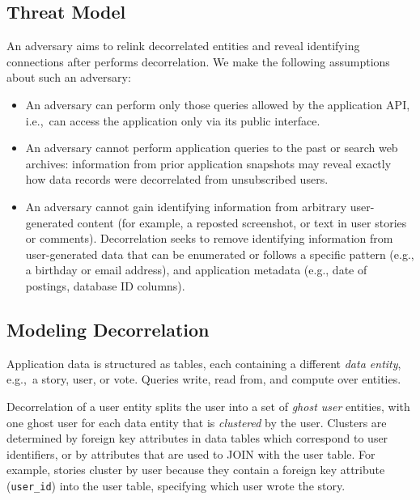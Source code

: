 \subsection{Threat Model} 
An adversary aims to relink decorrelated entities and reveal identifying connections after \sys{}
performs decorrelation. We make the following assumptions about such an adversary: 
\begin{itemize}
    \item An adversary can perform only those queries allowed by the application API, 
i.e.,\ can access the application only via its public interface. 

    \item An adversary cannot perform application queries to the past or search web archives:
    information from prior application snapshots may reveal 
    exactly how data records were decorrelated from unsubscribed users. 

    \item An adversary cannot gain identifying information from arbitrary user-generated content (for
        example, a reposted screenshot, or text in user stories or comments). Decorrelation seeks to
        remove identifying information from user-generated data that can be enumerated or follows a
        specific pattern (e.g., a birthday or email address), and application metadata (e.g., date
        of postings, database ID columns).
\end{itemize}

\subsection{Modeling Decorrelation}
Application data is structured as tables, each containing a different \emph{data entity}, e.g.,\ a
story, user, or vote.  
Queries write, read
from, and compute over entities. 

Decorrelation of a user entity splits the user into a set of \emph{ghost user} entities, with one
ghost user for each data entity that is \emph{clustered} by the user.  Clusters are determined by
foreign key attributes in data tables which correspond to user identifiers, or by attributes that
are used to JOIN with the user table.  For example, stories cluster by user because they contain a
foreign key attribute (\texttt{user\_id}) into the user table, specifying which user wrote the
story.

